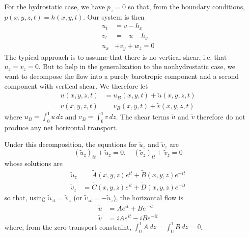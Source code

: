 \documentclass[letterpaper, 11pt]{article}
\begin{document}
For the hydrostatic case, we have $p_z = 0$ so that, from the boundary conditions, $p(x, y, z, t) = h(x, y, t)$. Our system is then
\begin{subequations}
\begin{align}
u_t &= v - h_x \\
v_t &= -u - h_y \\
u_x &+ v_y + w_z = 0
\end{align}
\end{subequations}
The typical approach is to assume that there is no vertical shear, i.e. that $u_z = v_z = 0$. But to help in the generalization to the nonhydrostatic case, we want to decompose the flow into a purely barotropic component and a second component with vertical shear. We therefore let
\begin{subequations}
\begin{align}
u(x,y,z,t) &= u_B(x,y,t) + \tilde{u}(x,y,z,t) \\
v(x,y,z,t) &= v_B(x,y,t) + \tilde{v}(x,y,z,t)
\end{align}
\end{subequations}
where $u_B = \int_0^1 u \, dz$ and $v_B = \int_0^1 v \, dz$. The shear terms $\tilde{u}$ and $\tilde{v}$ therefore do not produce any net horizontal transport.

Under this decomposition, the equations for $\tilde{u}_z$ and $\tilde{v}_z$ are
\begin{equation}
(\tilde{u}_z)_{tt} + \tilde{u}_z = 0, \quad (\tilde{v}_z)_{tt} + \tilde{v}_z = 0
\end{equation}
whose solutions are
\begin{subequations}
\begin{align}
\tilde{u}_z &= \tilde{A}(x,y,z) e^{it} + \tilde{B}(x,y,z) e^{-it} \\
\tilde{v}_z &= \tilde{C}(x,y,z) e^{it} + \tilde{D}(x,y,z) e^{-it}
\end{align}
\end{subequations}
so that, using $\tilde{u}_{zt} = \tilde{v}_z$ (or $\tilde{v}_{zt} = -\tilde{u}_z$), the horizontal flow is
\begin{subequations}
\begin{align}
\tilde{u} &= A e^{it} + B e^{-it} \\
\tilde{v} &= iA e^{it} - iB e^{-it}
\end{align}
\end{subequations}
where, from the zero-transport constraint, $\int_0^1 A \, dz = \int_0^1 B \, dz = 0$.
\end{document}

